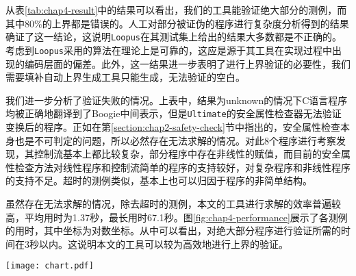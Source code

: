 从表\ref{tab:chap4-result}中的结果可以看出，我们的工具能验证绝大部分的测例，而其中80\%的上界都是错误的。人工对部分被证伪的程序进行复杂度分析得到的结果确证了这一结论，这说明\texttt{Loopus}在其测试集上给出的结果大多数都是不正确的。考虑到\texttt{Loopus}采用的算法在理论上是可靠的\cite{sinn_simple_2014}，这应是源于其工具在实现过程中出现的编码层面的偏差。此外，这一结果进一步表明了进行上界验证的必要性，我们需要填补自动上界生成工具只能生成，无法验证的空白。

我们进一步分析了验证失败的情况。上表中，结果为unknown的情况下C语言程序均被正确地翻译到了Boogie中间表示，但是\texttt{Ultimate}的安全属性检查器无法验证变换后的程序。正如在第\ref{section:chap2-safety-check}节中指出的，安全属性检查本身也是不可判定的问题，所以必然存在无法求解的情况。对此8个程序进行考察发现，其控制流基本上都比较复杂，部分程序中存在非线性的赋值，而目前的安全属性检查方法对线性程序和控制流简单的程序的支持较好，对复杂程序和非线性程序的支持不足。超时的测例类似，基本上也可以归因于程序的非简单结构。

虽然存在无法求解的情况，除去超时的测例，本文的工具进行求解的效率普遍较高，平均用时为1.37秒，最长用时67.1秒。图\ref{fig:chap4-performance}展示了各测例的用时，其中坐标为对数坐标。从中可以看出，对绝大部分程序进行验证所需的时间在3秒以内。这说明本文的工具可以较为高效地进行上界的验证。

\begin{sidewaysfigure}[]
    \centering
    \texttt{[image: chart.pdf]}
    \caption{验证成功的测例用时（对数坐标）}
    \label{fig:chap4-performance}
\end{sidewaysfigure}

